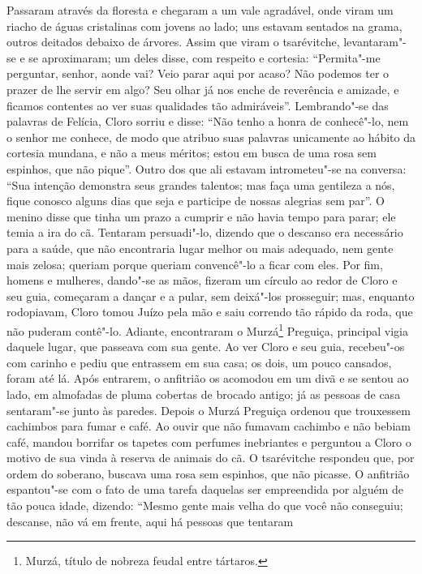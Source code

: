 Passaram através da floresta e chegaram a um vale agradável, onde viram
um riacho de águas cristalinas com jovens ao lado; uns estavam sentados
na grama, outros deitados debaixo de árvores. Assim que viram o
tsarévitche, levantaram"-se e se aproximaram; um deles disse, com
respeito e cortesia: ``Permita"-me perguntar, senhor, aonde vai? Veio
parar aqui por acaso? Não podemos ter o prazer de lhe servir em algo?
Seu olhar já nos enche de reverência e amizade, e ficamos contentes ao
ver suas qualidades tão admiráveis''. Lembrando"-se das palavras de
Felícia, Cloro sorriu e disse: ``Não tenho a honra de conhecê"-lo, nem o
senhor me conhece, de modo que atribuo suas palavras unicamente ao
hábito da cortesia mundana, e não a meus méritos; estou em busca de uma
rosa sem espinhos, que não pique''. Outro dos que ali estavam
intrometeu"-se na conversa: ``Sua intenção demonstra seus grandes
talentos; mas faça uma gentileza a nós, fique conosco alguns dias que
seja e participe de nossas alegrias sem par''. O menino disse que tinha
um prazo a cumprir e não havia tempo para parar; ele temia a ira do cã.
Tentaram persuadi"-lo, dizendo que o descanso era necessário para a
saúde, que não encontraria lugar melhor ou mais adequado, nem gente mais
zelosa; queriam porque queriam convencê"-lo a ficar com eles. Por fim,
homens e mulheres, dando"-se as mãos, fizeram um círculo ao redor de
Cloro e seu guia, começaram a dançar e a pular, sem deixá"-los prosseguir; mas, enquanto rodopiavam, Cloro tomou Juízo pela mão e saiu
correndo tão rápido da roda, que não puderam contê"-lo. Adiante,
encontraram o Murzá\footnote{Murzá, título de nobreza feudal entre
  tártaros.} Preguiça, principal vigia daquele lugar, que passeava com
sua gente. Ao ver Cloro e seu guia, recebeu"-os com carinho e pediu que
entrassem em sua casa; os dois, um pouco cansados, foram até lá. Após
entrarem, o anfitrião os acomodou em um divã e se sentou ao lado, em
almofadas de pluma cobertas de brocado antigo; já as pessoas de casa
sentaram"-se junto às paredes. Depois o Murzá Preguiça ordenou que
trouxessem cachimbos para fumar e café. Ao ouvir que não fumavam
cachimbo e não bebiam café, mandou borrifar os tapetes com perfumes
inebriantes e perguntou a Cloro o motivo de sua vinda à reserva de
animais do cã. O tsarévitche respondeu que, por ordem do soberano,
buscava uma rosa sem espinhos, que não picasse. O anfitrião espantou"-se
com o fato de uma tarefa daquelas ser empreendida por alguém de tão
pouca idade, dizendo: ``Mesmo gente mais velha do que você não
conseguiu; descanse, não vá em frente, aqui há pessoas que tentaram
